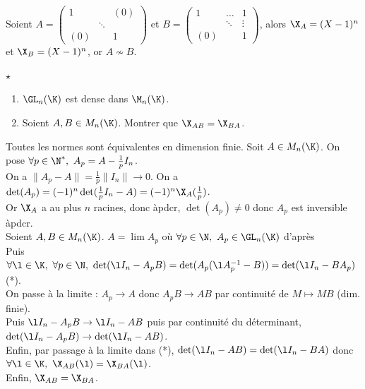 \documentclass[11pt]{article}
\begin{document}
\vspace*{-0.5cm}

\begin{ex}{}{}
    Soient $A=\begin{pmatrix}1& & (0)\\&\ddots&\\(0)&&1\end{pmatrix}$ et $B=\begin{pmatrix}1&\dots&1\\&\ddots&\vdots\\(0)&&1\end{pmatrix}$, alors $\X_A=(X-1)^n$ et $\X_B=(X-1)^n$, or $A\not\sim B$.
\end{ex}

\vspace*{-0.5cm}

\begin{prop}{$\star$}{}
    \begin{enumerate}
        \item $\GL_n(\K)$ est dense dans $\M_n(\K)$.
        \item Soient $A,B\in M_n(\K)$. Montrer que $\X_{AB}=\X_{BA}$.
    \end{enumerate}
    \tcblower
     Toutes les normes sont équivalentes en dimension finie. Soit $A\in M_n(\K)$. On pose $\forall p \in \N^*, ~ A_p = A-\frac{1}{p}I_n$.\\
    On a $\|A_p - A\| = \frac{1}{p}\|I_n\| \to 0$. On a $\det(A_p)=(-1)^n\det(\frac{1}{p}I_n-A)=(-1)^n\X_A(\frac{1}{p})$.\\
    Or $\X_A$ a au plus $n$ racines, donc àpdcr, $\det(A_p)\neq0$ donc $A_p$ est inversible àpdcr.\\
     Soient $A,B\in M_n(\K)$. $A=\lim A_p$ où $\forall p \in \N, ~ A_p \in \GL_n(\K)$ d'après \\
    Puis $\forall \l \in \K, ~ \forall p \in \N, ~ \det(\l I_n - A_pB)=\det(A_p(\l A_p^{-1} - B))=\det(\l I_n - BA_p)$ (*).\\
    On passe à la limite : $A_p \to A$ donc $A_pB\to AB$ par continuité de $M\mapsto MB$ (dim. finie).\\
    Puis $\l I_n - A_pB \to \l I_n - AB$  puis par continuité du déterminant, $\det(\l I_n - A_pB) \to \det(\l I_n - AB)$.\\
    Enfin, par passage à la limite dans (*), $\det(\l I_n - AB) = \det(\l I_n - BA)$ donc $\forall \l\in\K, ~ \X_{AB}(\l)=\X_{BA}(\l)$.\\
    Enfin, $\X_{AB}=\X_{BA}$.
\end{prop}
\end{document}
